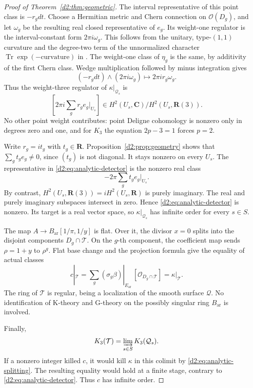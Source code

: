 \documentclass[11pt,a4paper]{amsart}
\numberwithin{equation}{section}
\theoremstyle{definition}
\theoremstyle{remark}
\newcommand{\DtwoRR}{\mathbf{R}}
\newcommand{\DtwoCC}{\mathbf{C}}
\newcommand{\DtwocO}{\mathcal O}
\newcommand{\DtwocQ}{\mathcal Q}
\newcommand{\DtwocT}{\mathcal T}
\newcommand{\Dtwoar}{\mathrm{ar}}
\DeclareMathOperator{\DtwoTr}{Tr}
\begin{document}
\begin{proof}[Proof of Theorem~\ref{d2:thm:geometric}]
The interval representative of this point class is \(-r_gdt\).
Choose a Hermitian metric and Chern connection on \(\DtwocO(D_g)\),
and let \(\omega_g\) be the resulting real closed representative of
\(e_g\). Its weight-one regulator is the interval-constant form
\(2\pi i\omega_g\).
This follows from the unitary, type-\((1,1)\) curvature and the
degree-two term of the unnormalized character
\(\DtwoTr\exp(-\mathrm{curvature})\) in
\cite[Definitions~2.16--2.20]{BunkeTamme}.
The weight-one class of \(\eta_g\) is the same, by additivity of
the first Chern class.
Wedge multiplication followed by minus integration gives
\[
 (-r_gdt)\wedge(2\pi i\omega_g)
 \longmapsto 2\pi i r_g\omega_g.
\]
Thus the weight-three regulator of \(\kappa|_{\DtwocQ_s}\) is
\begin{equation}\label{d2:eq:analytic-detector}
 \left[2\pi i\sum_g r_g e_g|_{U_s}\right]
 \in H^2(U_s,\DtwoCC)/H^2(U_s,\DtwoRR(3)).
\end{equation}
No other point weight contributes: point Deligne cohomology is
nonzero only in degrees zero and one, and for \(K_3\) the equation
\(2p-3=1\) forces \(p=2\).

Write \(r_g=it_g\) with \(t_g\in\DtwoRR\).
Proposition~\ref{d2:prop:geometry} shows that
\(\sum_g t_ge_g\ne0\), since \((t_g)\) is not diagonal.
It stays nonzero on every \(U_s\).
The representative in \eqref{d2:eq:analytic-detector} is the nonzero
real class
\[
 -2\pi\sum_g t_ge_g|_{U_s}.
\]
By contrast, \(H^2(U_s,\DtwoRR(3))=iH^2(U_s,\DtwoRR)\) is purely imaginary.
The real and purely imaginary subspaces intersect in zero.
Hence \eqref{d2:eq:analytic-detector} is nonzero.
Its target is a real vector space, so
\(\kappa|_{\DtwocQ_s}\) has infinite order for every \(s\in S\).

The map \(A\to B_{\Dtwoar}[1/\pi,1/y]\) is flat.
Over it, the divisor \(x=0\) splits into the disjoint components
\(D_g\cap\DtwocT\).
On the \(g\)-th component, the coefficient map sends
\(\rho=1+y\) to \(\rho^g\).
Flat base change and the projection formula give the equality of
actual classes
\begin{equation}\label{d2:eq:analytic-splitting}
 c|_{\DtwocT}
 =\sum_g(\sigma_g\beta)|_{E_{\Dtwoar}}\,[\DtwocO_{D_g\cap\DtwocT}]
 =\kappa|_{\DtwocT}.
\end{equation}
The ring of \(\DtwocT\) is regular, being a localization of the smooth
surface \(\DtwocQ\). No identification of K-theory and G-theory on the
possibly singular ring \(B_{\Dtwoar}\) is involved.

Finally,
\[
 K_3(\DtwocT)=\varinjlim_{s\in S}K_3(\DtwocQ_s).
\]
If a nonzero integer killed \(c\), it would kill \(\kappa\) in this
colimit by \eqref{d2:eq:analytic-splitting}.
The resulting equality would hold at a finite stage, contrary to
\eqref{d2:eq:analytic-detector}. Thus \(c\) has infinite order.
\end{proof}
\end{document}

